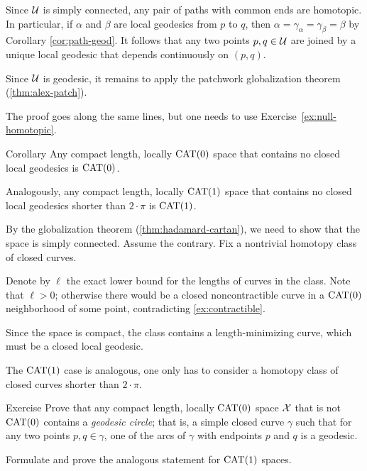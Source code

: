 Since $\mathcal{U}$ is simply connected, any pair of paths with common ends are homotopic.  In particular, if $\alpha$ and $\beta$ are local geodesics from $p$ to $q$, then $\alpha =\gamma_\alpha=\gamma_\beta=\beta$ by Corollary \ref{cor:path-geod}.
It follows that any two points $p,q\in\mathcal{U}$ are joined by a unique local geodesic that depends continuously on $(p,q)$.

Since $\mathcal{U}$ is geodesic, it remains to apply the patchwork globalization theorem (\ref{thm:alex-patch}).

The proof goes along the same lines, 
but one needs to use Exercise~\ref{ex:null-homotopic}. \qeds

\begin{thm}{Corollary}\label{cor:closed-geod-cat} 
Any compact length, locally $\mathrm{CAT}(0)$ space that contains no closed local geodesics is $\mathrm{CAT}(0)$. 
 
Analogously, any compact length, locally $\mathrm{CAT}(1)$ space that  contains no closed local geodesics shorter than $2\cdot\pi$ is $\mathrm{CAT}(1)$.
\end{thm}

By the globalization theorem (\ref{thm:hadamard-cartan}), we need to show that the space is simply connected.
Assume the contrary. 
Fix a nontrivial homotopy class of closed curves.

Denote by $\ell$ the exact lower bound for the lengths of curves in the class.
Note that $\ell>0$;
otherwise there would be a closed noncontractible curve in a $\mathrm{CAT}(0)$ neighborhood of some point, contradicting \ref{ex:contractible}.

Since the space is compact, the class contains a length-minimizing curve, 
which must be a closed local geodesic. 

The $\mathrm{CAT}(1)$ case is analogous, one only has to consider a homotopy class of closed curves shorter than $2\cdot\pi$.
\qeds

\begin{thm}{Exercise}\label{ex:geod-circle}
Prove that any compact length, locally $\mathrm{CAT}(0)$ space $\mathcal{X}$ that is not $\mathrm{CAT}(0)$ contains a \emph{geodesic circle};
that is, a simple closed curve $\gamma$ such that 
for any two points $p,q\in\gamma$, one of the arcs of $\gamma$ with endpoints $p$ and $q$ is a  geodesic.

Formulate and prove the analogous statement for $\mathrm{CAT}(1)$ spaces.
\end{thm}

